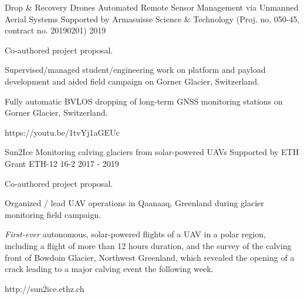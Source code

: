 \label{sec:proj}
\begin{cventries}

  \cvprojwideentry
  	{Drop \& Recovery Drones} %
  	{Automated Remote Sensor Management via Unmanned Aerial Systems} %
    {Supported by Armasuisse Science \& Technology (Proj. no. 050-45, contract no. 20190201)} %
    {2019} %
    {
      \begin{cvitems} %
        \item {Co-authored project proposal.}
        \item {Supervised/managed student/engineering work on platform and payload development and aided field campaign on Gorner Glacier, Switzerland.}
        \item {Fully automatic BVLOS dropping of long-term GNSS monitoring stations on Gorner Glacier, Switzerland.}
      \end{cvitems}
    } %
    {https://youtu.be/1tvYj1aGEUc} %
    {\showprojectdescriptions}

  \cvprojwideentry
  	{Sun2Ice} %
  	{Monitoring calving glaciers from solar-powered UAVs} %
    {Supported by ETH Grant ETH-12 16-2} %
    {2017 - 2019} %
    {
      \begin{cvitems} %
        \item {Co-authored project proposal.}
        \item {Organized / lead UAV operations in Qaanaaq, Greenland during glacier monitoring field campaign.}
        \item {\emph{First-ever} autonomous, solar-powered flights of a UAV in a polar region, including a flight of more than 12 hours duration, and the survey of the calving front of Bowdoin Glacier, Northwest Greenland, which revealed the opening of a crack leading to a major calving event the following week.}
      \end{cvitems}
    } %
    {http://sun2ice.ethz.ch} %
    {\showprojectdescriptions}
    

\end{cventries}
